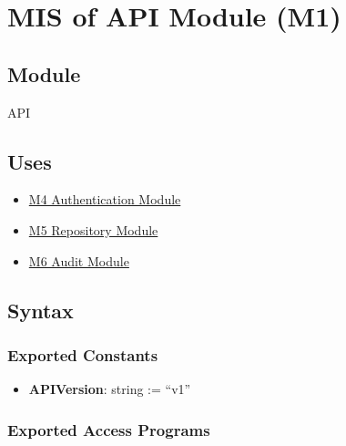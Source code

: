 \documentclass[12pt, titlepage]{article}
\begin{document}
\newpage
\section{MIS of API Module (M1)}\label{sec:api-module}

\subsection{Module}
API

\subsection{Uses}
\begin{itemize}
    \item \hyperref[sec:authentication-module]{M4 Authentication Module}
    \item \hyperref[sec:repository-module]{M5 Repository Module}
    \item \hyperref[sec:audit-module]{M6 Audit Module}
\end{itemize}

\subsection{Syntax}

\subsubsection{Exported Constants}
\begin{itemize}
    \item \textbf{APIVersion}: string := ``v1''
\end{itemize}

\subsubsection{Exported Access Programs}
\end{document}
